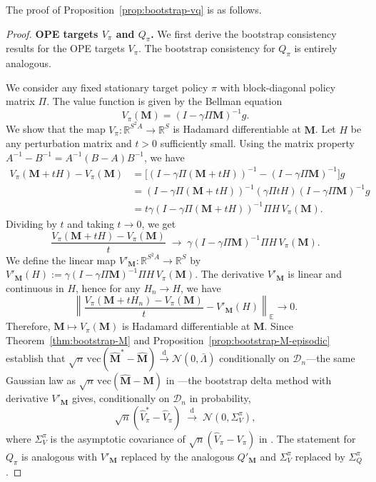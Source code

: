 \documentclass{article}
\numberwithin{equation}{section}
\begin{document}
The proof of Proposition~\ref{prop:bootstrap-vq} is as follows.
\begin{proof}
\noindent\textbf{OPE targets $V_\pi$ and $Q_\pi$.}
We first derive the bootstrap consistency results for the OPE targets $V_\pi$.
The bootstrap consistency for $Q_\pi$ is entirely analogous.

We consider any fixed stationary target policy $\pi$ with block-diagonal policy matrix $\Pi$.
The value function is given by the Bellman equation
\[
V_\pi(\mathbf{M}) = (I-\gamma\Pi\mathbf{M})^{-1}g.
\]
We show that the map $V_\pi: \mathbb{R}^{S^2A} \to \mathbb{R}^S$ is Hadamard differentiable at $\mathbf{M}$.
Let $H$ be any perturbation matrix and $t>0$ sufficiently small. Using the matrix property $A^{-1}-B^{-1}=A^{-1}(B-A)B^{-1}$, we have
\begin{align*}
V_\pi(\mathbf{M}+tH)-V_\pi(\mathbf{M})
&= \bigl[(I-\gamma\Pi(\mathbf{M}+tH))^{-1}-(I-\gamma\Pi\mathbf{M})^{-1}\bigr]g \\
&= (I-\gamma\Pi(\mathbf{M}+tH))^{-1}(\gamma\Pi tH)(I-\gamma\Pi\mathbf{M})^{-1}g \\
&= t\gamma(I-\gamma\Pi(\mathbf{M}+tH))^{-1}\Pi H\,V_\pi(\mathbf{M}).
\end{align*}
Dividing by $t$ and taking $t\to 0$, we get
\[
\frac{V_\pi(\mathbf{M}+tH)-V_\pi(\mathbf{M})}{t} \;\to\; \gamma(I-\gamma\Pi\mathbf{M})^{-1}\Pi H\,V_\pi(\mathbf{M}).
\]
We define the linear map $V'_\mathbf{M}:\mathbb{R}^{S^2A}\to\mathbb{R}^S$ by $V'_\mathbf{M}(H) := \gamma(I-\gamma\Pi\mathbf{M})^{-1}\Pi H\,V_\pi(\mathbf{M})$.
The derivative $V'_\mathbf{M}$ is linear and continuous in $H$, hence for any $H_n\to H$, we have
\[
\left\|\frac{V_\pi(\mathbf{M}+tH_n)-V_\pi(\mathbf{M})}{t} - V'_\mathbf{M}(H) \right\|_{\mathbb{E}} \to 0.
\]
Therefore, $\mathbf{M}\mapsto V_\pi(\mathbf{M})$ is Hadamard differentiable at $\mathbf{M}$.
Since Theorem~\ref{thm:bootstrap-M} and Proposition~\ref{prop:bootstrap-M-episodic} establish that
$\sqrt{n}\,\mathrm{vec}(\hat{\mathbf{M}}^\ast-\hat{\mathbf{M}})\xrightarrow{\mathrm{d}}\mathcal{N}(0,\bar\Lambda)$
conditionally on $\mathcal{D}_n$---the same Gaussian law as $\sqrt{n}\,\mathrm{vec}(\hat{\mathbf{M}}-\mathbf{M})$
in \citet[Corollary~1]{su2025centrallimittheoremstransition}---the bootstrap delta method with derivative $V'_\mathbf{M}$ gives,
conditionally on $\mathcal{D}_n$ in probability,
\[
\sqrt{n}(\hat V_\pi^\ast - \hat V_\pi) \;\xrightarrow{\mathrm{d}}\; \mathcal{N}(0,\Sigma_V^\pi),
\]
where $\Sigma_V^\pi$ is the asymptotic covariance of $\sqrt{n}(\hat V_\pi - V_\pi)$ in
\citet[Theorem~2]{su2025centrallimittheoremstransition}.
The statement for $Q_\pi$ is analogous with $V'_\mathbf{M}$ replaced by the analogous $Q'_\mathbf{M}$ and $\Sigma_V^\pi$ replaced by $\Sigma_Q^\pi$.


\end{proof}
\end{document}
